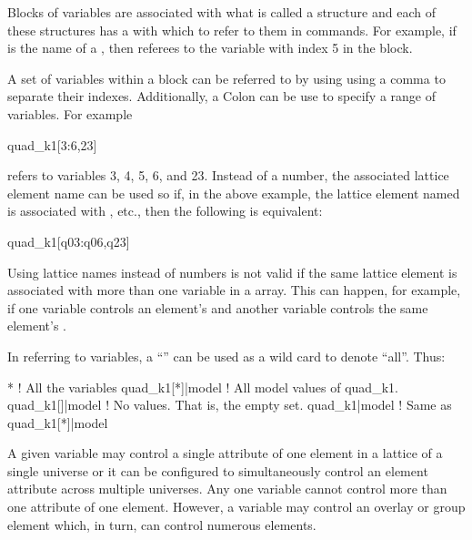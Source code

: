 Blocks of variables are associated with what is called a 
structure and each of these structures has a  with which to
refer to them in \tao commands. For example, if  is the
name of a , then  referees to the variable 
with index 5 in the block. 

A set of variables within a  block
can be referred to by using using a comma \vn{,} to
separate their indexes. Additionally, a Colon \vn{:} can be use to
specify a range of variables. For example
\begin{example}
  quad_k1[3:6,23]
\end{example}
refers to variables 3, 4, 5, 6, and 23. Instead of a number, the
associated lattice element name can be used so if, in the above
example, the lattice element named  is associated with
, etc., then the following is equivalent:
\begin{example}
  quad_k1[q03:q06,q23]
\end{example}
Using lattice names instead of numbers is not valid if the same
lattice element is associated with more than one variable in a
 array. This can happen, for example, if one variable controls
an element's  and another variable controls the same element's
. 

In referring to variables, a ``\vn{*}'' can be used as a wild card to 
denote ``all''. Thus:
\begin{example}
  *                ! All the variables
  quad_k1[*]|model ! All model values of quad_k1.
  quad_k1[]|model  ! No values. That is, the empty set.
  quad_k1|model    ! Same as quad_k1[*]|model
\end{example}

A given variable may control a single attribute of one element in a
 lattice of a single universe or it can be configured to
simultaneously control an element attribute across multiple
universes. Any one variable cannot control more than one attribute of
one element. However, a variable may control an overlay or group
element which, in turn, can control numerous elements.


